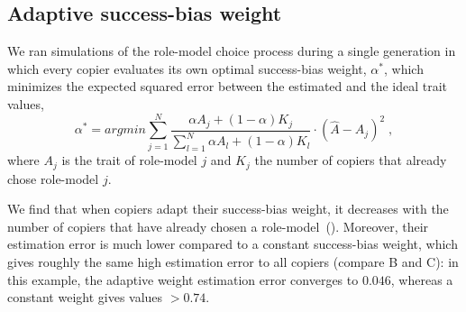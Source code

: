 \documentclass[12pt]{extarticle}
\begin{document}
\subsection*{Adaptive success-bias weight}

We ran simulations of the role-model choice process during a single generation in which every copier evaluates its own optimal success-bias weight, $\alpha^*$, which minimizes the expected squared error between the estimated and the ideal trait values,
\begin{equation}
\alpha^* = \textit{argmin} \sum_{j=1}^N\frac{\alpha A_j + (1-\alpha) K_j}{\sum_{l=1}^N\alpha A_l + (1-\alpha) K_l}\cdot (\hat{A}-A_j)^2 \;,
\end{equation}
where $A_j$ is the trait of role-model $j$ and $K_j$ the number of copiers that already chose role-model $j$.

We find that when copiers adapt their success-bias weight, it decreases with the number of copiers that have already chosen a role-model~().
Moreover, their estimation error is much lower compared to a constant success-bias weight, which gives roughly the same high estimation error to all copiers (compare B and C): in this example, the adaptive weight estimation error converges to $0.046$, whereas a constant weight gives values $>0.74$.
\end{document}
